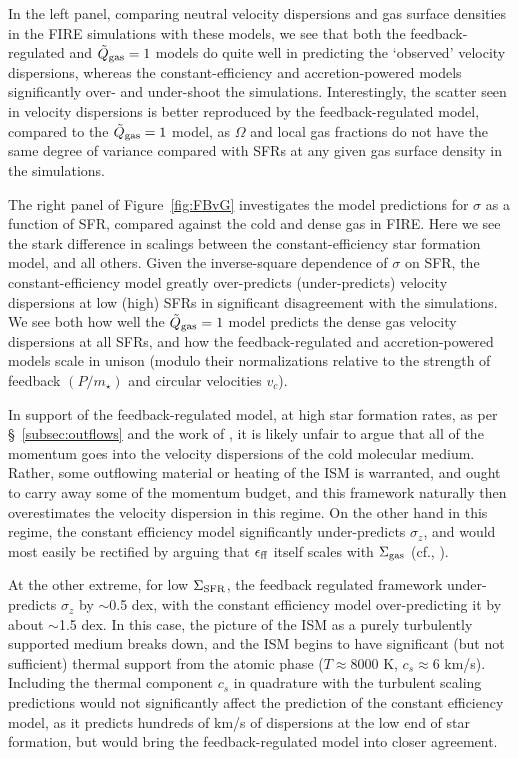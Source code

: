 \documentclass[usletter,fleqn,usenatbib]{mnras}
\begin{document}
In the left panel, comparing neutral velocity dispersions and gas surface densities in the FIRE simulations with these models, we see that both the feedback-regulated and $\tilde Q_{\rm gas} = 1$ models do quite well in predicting the `observed' velocity dispersions, whereas the constant-efficiency and accretion-powered models significantly over- and under-shoot the simulations.  Interestingly, the scatter seen in velocity dispersions is better reproduced by the feedback-regulated model, compared to the $\tilde Q_{\rm gas} = 1$ model, as $\Omega$ and local gas fractions do not have the same degree of variance compared with SFRs at any given gas surface density in the simulations.

The right panel of Figure~\ref{fig:FBvG} investigates the model predictions for $\sigma$ as a function of SFR, compared against the cold and dense gas in FIRE.  Here we see the stark difference in scalings between the constant-efficiency star formation model, and all others.  Given the inverse-square dependence of $\sigma$ on SFR, the constant-efficiency model greatly over-predicts (under-predicts) velocity dispersions at low (high) SFRs in significant disagreement with the simulations.  We see both how well the $\tilde Q_{\rm gas} = 1$ model predicts the dense gas velocity dispersions at all SFRs, and how the feedback-regulated and accretion-powered models scale in unison (modulo their normalizations relative to the strength of feedback $(P/m_\star)$ and circular velocities $v_c$).

In support of the feedback-regulated model, at high star formation rates, as per \S~\ref{subsec:outflows} and the work of \citet{Hayward2017}, it is likely unfair to argue that all of the momentum goes into the velocity dispersions of the cold molecular medium.  Rather, some outflowing material or heating of the ISM is warranted, and ought to carry away some of the momentum budget, and this framework naturally then overestimates the velocity dispersion in this regime.  On the other hand in this regime, the constant efficiency model significantly under-predicts $\sigma_z$, and would most easily be rectified by arguing that $\epsilon_{\rm ff}$ itself scales with $\Sigma_{\rm gas}$ (cf., \citealt{Grudic2018}).

At the other extreme, for low $\Sigma_{\rm SFR}$, the feedback regulated framework under-predicts $\sigma_z$ by $\sim$0.5 dex, with the constant efficiency model over-predicting it by about $\sim$1.5 dex.  In this case, the picture of the ISM as a purely turbulently supported medium breaks down, and the ISM begins to have significant (but not sufficient) thermal support from the atomic phase ($T \approx 8000$ K, $c_s\approx 6$ km/s).  Including the thermal component $c_s$ in quadrature with the turbulent scaling predictions would not significantly affect the prediction of the constant efficiency model, as it predicts hundreds of km/s of dispersions at the low end of star formation, but would bring the feedback-regulated model into closer agreement.
\end{document}
